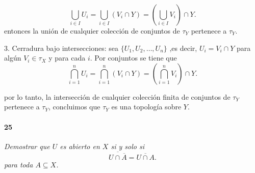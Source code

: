 \documentclass[12pt]{article}
\begin{document}
\[
\bigcup_{i \in I} U_i = \bigcup_{i \in I} (V_i \cap Y) = \left( \bigcup_{i \in I} V_i \right) \cap Y.
\]
entonces la unión de cualquier colecci\'on de conjuntos de \( \tau_Y \) pertenece a \( \tau_Y \).

3. Cerradura bajo intersecciones: sea \( \{ U_1, U_2, \dots, U_n \} \) ,es decir, \( U_i = V_i \cap Y \) para algún \( V_i \in \tau_X \) y para cada \( i \). 
Por conjuntos se tiene que
\[
\bigcap_{i=1}^n U_i = \bigcap_{i=1}^n (V_i \cap Y) = \left( \bigcap_{i=1}^n V_i \right) \cap Y.
\]

por lo tanto, la intersección de cualquier colecci\'on finita de conjuntos de \( \tau_Y \) pertenece a \( \tau_Y \), 
concluimos que \( \tau_Y \) es una topolog\'ia sobre \( Y \).

\paragraph{25}
\textit{Demostrar que \( U \) es abierto en \( X \) si y solo si\[
\overline{U \cap \overline{A}} = \overline{U \cap A}.
\] para toda \( A \subseteq X \).}
\end{document}
